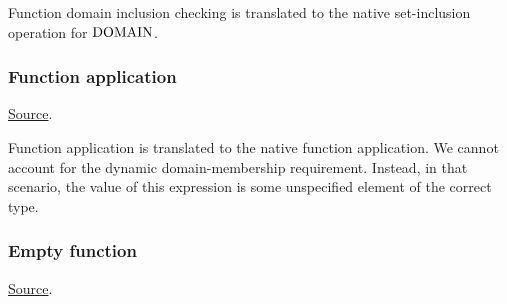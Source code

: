 
\begin{mathpar}
\end{mathpar}
Function domain inclusion checking is translated to the \tlap{} native set-inclusion operation for $\DOMAIN$.

\subsubsection{ Function application}
\href{https://github.com/saltiniroberto/ssf/blob/7ea6e18093d9da3154b4e396dd435549f687e6b9/high_level/common/pythonic_code_generic.py#L104-L106}{Source}.



\begin{mathpar}
\end{mathpar}
Function application is translated to the \tlap{} native function application. We cannot account for the dynamic domain-membership requirement. Instead, in that scenario, the value of this expression is some unspecified element of the correct type.


\subsubsection{ Empty function}
\href{https://github.com/saltiniroberto/ssf/blob/7ea6e18093d9da3154b4e396dd435549f687e6b9/high_level/common/pythonic_code_generic.py#L109-L110}{Source}.


